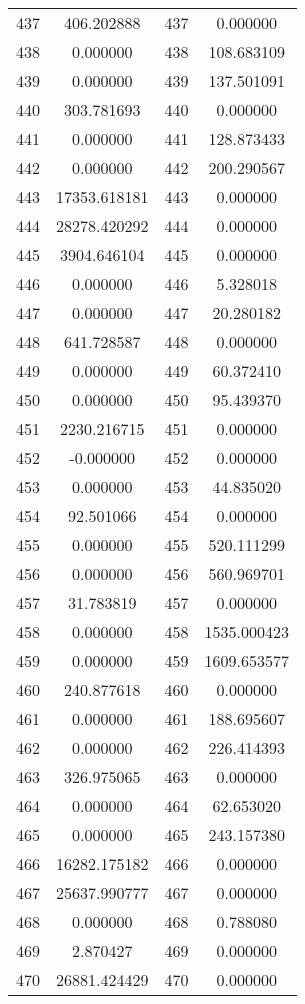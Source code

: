 \documentclass[12pt]{article}
\begin{document}
\begin{longtable}{@{}cccc@{}}
437 & 406.202888 & 437 & 0.000000 \\
438 & 0.000000 & 438 & 108.683109 \\
439 & 0.000000 & 439 & 137.501091 \\
440 & 303.781693 & 440 & 0.000000 \\
441 & 0.000000 & 441 & 128.873433 \\
442 & 0.000000 & 442 & 200.290567 \\
443 & 17353.618181 & 443 & 0.000000 \\
444 & 28278.420292 & 444 & 0.000000 \\
445 & 3904.646104 & 445 & 0.000000 \\
446 & 0.000000 & 446 & 5.328018 \\
447 & 0.000000 & 447 & 20.280182 \\
448 & 641.728587 & 448 & 0.000000 \\
449 & 0.000000 & 449 & 60.372410 \\
450 & 0.000000 & 450 & 95.439370 \\
451 & 2230.216715 & 451 & 0.000000 \\
452 & -0.000000 & 452 & 0.000000 \\
453 & 0.000000 & 453 & 44.835020 \\
454 & 92.501066 & 454 & 0.000000 \\
455 & 0.000000 & 455 & 520.111299 \\
456 & 0.000000 & 456 & 560.969701 \\
457 & 31.783819 & 457 & 0.000000 \\
458 & 0.000000 & 458 & 1535.000423 \\
459 & 0.000000 & 459 & 1609.653577 \\
460 & 240.877618 & 460 & 0.000000 \\
461 & 0.000000 & 461 & 188.695607 \\
462 & 0.000000 & 462 & 226.414393 \\
463 & 326.975065 & 463 & 0.000000 \\
464 & 0.000000 & 464 & 62.653020 \\
465 & 0.000000 & 465 & 243.157380 \\
466 & 16282.175182 & 466 & 0.000000 \\
467 & 25637.990777 & 467 & 0.000000 \\
468 & 0.000000 & 468 & 0.788080 \\
469 & 2.870427 & 469 & 0.000000 \\
470 & 26881.424429 & 470 & 0.000000 \\

\end{longtable}
\end{document}

